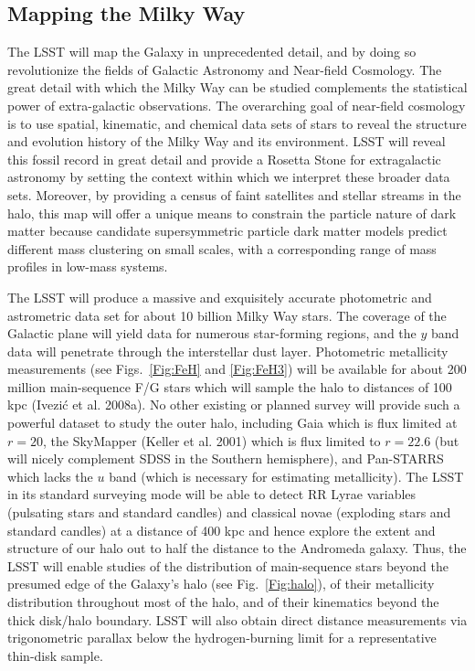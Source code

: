 \documentclass{emulateapj}
\begin{document}
\subsection{ Mapping the Milky Way }

The LSST will map the Galaxy in unprecedented detail, and by doing so revolutionize 
the fields of Galactic Astronomy and Near-field Cosmology. The great detail with which 
the Milky Way can be studied complements the statistical power of extra-galactic 
observations.  The overarching goal of near-field cosmology is to use spatial, kinematic, 
and chemical data sets of stars to reveal the structure and evolution history
of the Milky Way and its environment. LSST will reveal this fossil record in
great detail and provide a Rosetta Stone for extragalactic astronomy by
setting the context within which we interpret these broader data
sets. Moreover, by providing a census of faint satellites and stellar streams
in the halo, this map will offer a unique means to constrain the 
particle nature of dark matter because candidate supersymmetric particle dark
matter models predict different mass clustering on small scales, with a
corresponding range of mass profiles in low-mass systems. 


The LSST will produce a massive and exquisitely accurate photometric and astrometric data 
set for about 10 billion Milky Way stars. The coverage of the Galactic plane
will yield data for numerous star-forming regions, and the $y$ band data 
will penetrate through the interstellar dust layer. Photometric metallicity
measurements (see Figs.~\ref{Fig:FeH} and \ref{Fig:FeH3}) will be available for about 
200 million main-sequence F/G stars which will sample the halo to distances of 100 kpc 
(Ivezi\'{c} et al. 2008a). No other existing or planned survey will provide
such a powerful dataset to study the outer halo, including Gaia
which is flux limited at $r=20$, the SkyMapper (Keller et al. 2001) which is flux limited to $r=22.6$
(but will nicely complement SDSS in the Southern hemisphere), and Pan-STARRS 
which lacks the $u$ band (which is necessary for estimating metallicity). 
The LSST in its standard surveying mode will be able to detect RR Lyrae 
variables (pulsating stars and standard candles) and classical novae
(exploding stars and standard candles) at a distance of 400 kpc and hence
explore the extent and structure of our  halo out to half the distance to 
the Andromeda galaxy. Thus, the LSST will enable studies of 
the distribution of main-sequence stars beyond the presumed edge of the 
Galaxy's halo (see Fig.~\ref{Fig:halo}), of their metallicity distribution 
throughout most of the halo, and of their kinematics beyond the thick
disk/halo boundary. LSST will also obtain direct distance measurements via
trigonometric parallax below the hydrogen-burning limit for a representative 
thin-disk sample. 
\end{document}
